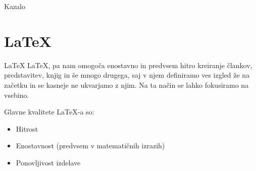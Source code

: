 \documentclass{beamer}
\begin{document}
\begin{frame}{\small Kazalo}
    \tableofcontents
\end{frame}

\section{LaTeX}
\begin{frame}{\small LaTeX}
    LaTeX, pa nam omogoča enostavno in predvsem hitro kreiranje člankov, predstavitev, knjig in še mnogo drugega, saj v njem definiramo ves izgled že na začetku in se kasneje ne ukvarjamo z njim. Na ta način se lahko fokusiramo na vsebino. 
    
    \vspace{0.5cm}
    \pause
    Glavne kvalitete LaTeX-a so:
    \begin{itemize}
        \item{Hitrost}
        \pause
        \item{Enostavnost (predvsem v matematičnih izrazih)}
        \pause
        \item{Ponovljivost izdelave}
    \end{itemize}
    
\end{frame}
\end{document}
